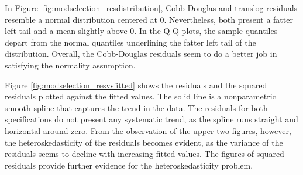 \documentclass[12pt,a4paper]{article}\usepackage[]{graphicx}\usepackage[]{color}
\begin{document}
In Figure \ref{fig:modselection_resdistribution}, Cobb-Douglas and translog residuals resemble a normal distribution centered at 0. Nevertheless, both present a fatter left tail and a mean slightly above 0. In the Q-Q plots, the sample quantiles depart from the normal quantiles underlining the fatter left tail of the distribution. Overall, the Cobb-Douglas residuals seem to do a better job in satisfying the normality assumption.




Figure \ref{fig:modselection_resvsfitted} shows the residuals and the squared residuals plotted against the fitted values. The solid line is a nonparametric smooth spline that captures the trend in the data. The residuals for both specifications do not present any systematic trend, as the spline runs straight and horizontal around zero. From the observation of the upper two figures, however, the heteroskedasticity of the residuals becomes evident, as the variance of the residuals seems to decline with increasing fitted values. The figures of squared residuals provide further evidence for the heteroskedasticity problem.

\end{document}
